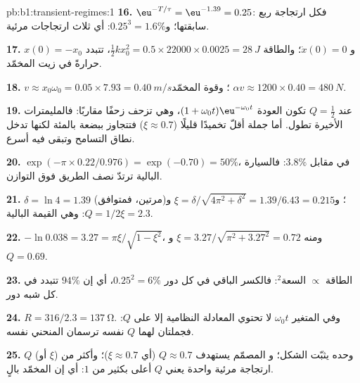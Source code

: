 \begin{solution}{pb:b1:transient-regimes:1}
\textbf{16.} $\eu^{-T/\tau} = \eu^{-1.39} = 0.25$: فكل ارتجاجة ربع
سابقتها؛ و$0.25^3 = 1.6\%$: أي ثلاث ارتجاجات مرئية.

\textbf{17.} $x(0) = -x_0$ و $\dot x(0) = 0$؛ والطاقة $\tfrac12 kx_0^2 =
0.5 \times 22000 \times 0.0025 = \qty{28}{J}$، تتبدد حرارةً في
زيت المخمّد.

\textbf{18.} $v \approx x_0\omega_0 = 0.05 \times 7.93 = \qty{0.40}{m/s}$؛
وقوة المخمّد $\alpha v \approx 1200 \times 0.40 = \qty{480}{N}$.

\textbf{19.} عند $Q = \tfrac12$ تكون العودة $(1 + \omega_0 t)\eu^{-\omega_0
t}$، وهي تزحف زحفًا مقاربًا: فالمليمترات الأخيرة تطول. أما
جملة أقلّ تخميدًا قليلًا ($\xi \approx 0.7$) فتتجاوز ببضعة
بالمئة لكنها تدخل نطاق التسامح وتبقى فيه أسرع.

\textbf{20.} $\exp(-\pi \times 0.22/0.976) = \exp(-0.70) = 50\%$، في مقابل
$3.8\%$: فالسيارة البالية ترتدّ نصف الطريق فوق التوازن.

\textbf{21.} $\delta = \ln 4 = 1.39$ (مرتين، فمتوافق)؛ و$\xi =
\delta/\sqrt{4\pi^2 + \delta^2} = 1.39/6.43 = 0.215$ و $Q = 1/2\xi = 2.3$:
وهي القيمة البالية.

\textbf{22.} $-\ln 0.038 = 3.27 = \pi\xi/\sqrt{1 - \xi^2}$، ومنه $\xi =
3.27/\sqrt{\pi^2 + 3.27^2} = 0.72$ و $Q = 0.69$.

\textbf{23.} الطاقة $\propto$ السعة$^2$: فالكسر الباقي في كل
دور $0.25^2 = 6\%$، أي إن $94\%$ تتبدد في كل شبه دور.

\textbf{24.} $R = 316/2.3 = \qty{137}{\ohm}$. وفي المتغير $\omega_0 t$
لا تحتوي المعادلة النظامية إلا على $Q$: فجملتان لهما $Q$ نفسه
ترسمان المنحني نفسه.

\textbf{25.}  $Q$ (أو $\xi$) وحده يثبّت الشكل؛ و
المصمّم يستهدف $Q \approx 0.7$ (أي $\xi \approx 0.7$)؛ وأكثر من ارتجاجة
مرئية واحدة يعني $Q$ أعلى بكثير من $1$: أي إن المخمّد بالٍ.
\end{solution}
